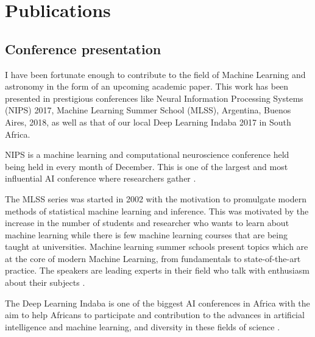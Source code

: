 \chapter*{Publications}

\section*{Conference presentation}

I have been fortunate enough to contribute to the field of Machine Learning and astronomy in the form of an
upcoming academic paper. This work has been presented in prestigious conferences like Neural Information Processing Systems (NIPS) 2017, Machine Learning Summer School (MLSS), Argentina, Buenos Aires, 2018, as well as that of our local Deep Learning Indaba 2017 in South Africa.

NIPS is a machine learning and computational neuroscience conference held being held in every month of December. This is one of the largest and most influential AI conference where researchers gather \citep{NIPS}. 

The MLSS series was started in 2002 with the motivation to
promulgate modern methods of statistical machine learning and inference. This was motivated by the increase in the number of students and researcher who wants to learn about machine learning while there is few machine learning courses that are being taught at universities.
Machine learning summer schools present topics which are at the core of modern Machine Learning, from fundamentals to state-of-the-art practice. The speakers are leading experts in their field who talk with enthusiasm about their subjects \citep{MLSS}.

The Deep Learning Indaba is one of the biggest AI conferences in Africa with the aim to help Africans to participate and contribution to the advances in artificial intelligence and machine learning, and diversity in these fields of science \citep{DLI}. 
 